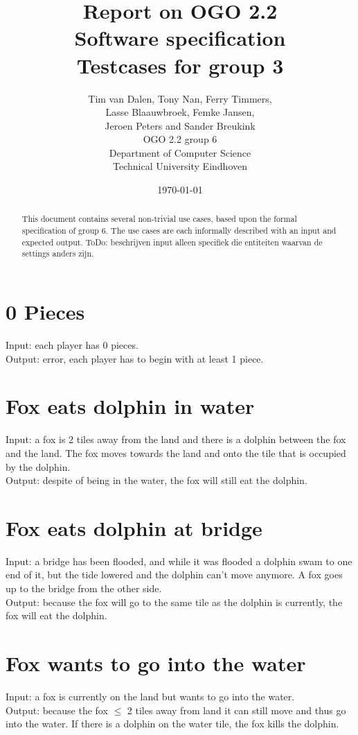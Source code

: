 \documentclass[a4paper,11pt]{article}
\title{Report on OGO 2.2 \\ Software specification\\ Testcases for group 3}
\author{
        Tim van Dalen, Tony Nan, Ferry Timmers, \\ Lasse Blaauwbroek, Femke Jansen, \\Jeroen Peters and Sander Breukink\\ OGO 2.2 group 6 \\
                Department of Computer Science\\
        Technical University Eindhoven\\
}
\date{\today}
\begin{document}
\maketitle

    \begin{abstract}
    This document contains several non-trivial use cases, based upon the formal specification of group 6. The use cases are each informally described with an input and expected output. ToDo: beschrijven input alleen specifiek die entiteiten waarvan de settings anders zijn.
    \end{abstract}
	
	\section{0 Pieces}
    Input: each player has 0 pieces.\\
    Output: error, each player has to begin with at least 1 piece.

	\section{Fox eats dolphin in water}
    Input: a fox is 2 tiles away from the land and there is a dolphin between the fox and the land. The fox moves towards the land and onto the tile that is occupied by the dolphin.\\
    Output: despite of being in the water, the fox will still eat the dolphin.\\

    \section{Fox eats dolphin at bridge}
    Input: a bridge has been flooded, and while it was flooded a dolphin swam to one end of it, but the tide lowered and the dolphin can't move anymore. A fox goes up to the bridge from the other side.\\
    Output: because the fox will go to the same tile as the dolphin is currently, the fox will eat the dolphin.\\

    \section{Fox wants to go into the water}
    Input: a fox is currently on the land but wants to go into the water.\\
    Output: because the fox $\leq$ 2 tiles away from land it can still move and thus go into the water. If there is a dolphin on the water tile, the fox kills the dolphin.\\
\end{document}
